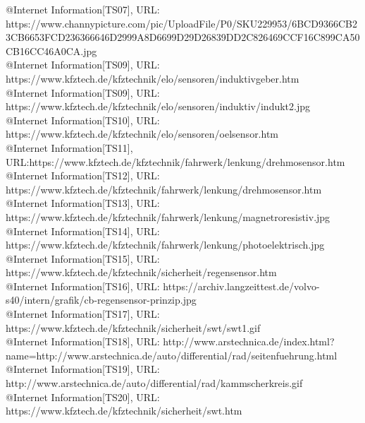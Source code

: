 @Internet{ Information[TS07],
	URL: https://www.channypicture.com/pic/UploadFile/P0/SKU229953/6BCD9366CB23CB6653FCD236366646D2999A8D6699D29D26839DD2C826469CCF16C899CA50CB16CC46A0CA.jpg}
\\

@Internet{ Information[TS09],
	URL:
https://www.kfztech.de/kfztechnik/elo/sensoren/induktivgeber.htm\
\\

@Internet{ Information[TS09],
	URL: https://www.kfztech.de/kfztechnik/elo/sensoren/induktiv/indukt2.jpg}
\\

@Internet{ Information[TS10],
	URL: https://www.kfztech.de/kfztechnik/elo/sensoren/oelsensor.htm}
\\

@Internet{ Information[TS11],
	URL:https://www.kfztech.de/kfztechnik/fahrwerk/lenkung/drehmosensor.htm}
\\

@Internet{ Information[TS12],
	URL: https://www.kfztech.de/kfztechnik/fahrwerk/lenkung/drehmosensor.htm}
\\

@Internet{ Information[TS13],
	URL: https://www.kfztech.de/kfztechnik/fahrwerk/lenkung/magnetroresistiv.jpg}
\\

@Internet{ Information[TS14],
	URL: https://www.kfztech.de/kfztechnik/fahrwerk/lenkung/photoelektrisch.jpg}
\\

@Internet{ Information[TS15],
	URL: https://www.kfztech.de/kfztechnik/sicherheit/regensensor.htm}
\\

@Internet{ Information[TS16],
	URL: https://archiv.langzeittest.de/volvo-s40/intern/grafik/cb-regensensor-prinzip.jpg}
\\

@Internet{ Information[TS17],
	URL: https://www.kfztech.de/kfztechnik/sicherheit/swt/swt1.gif}
\\

@Internet{ Information[TS18],
	URL: http://www.arstechnica.de/index.html?name=http://www.arstechnica.de/auto/differential/rad/seitenfuehrung.html}
\\

@Internet{ Information[TS19],
	URL: http://www.arstechnica.de/auto/differential/rad/kammscherkreis.gif}
\\

@Internet{ Information[TS20],
	URL: https://www.kfztech.de/kfztechnik/sicherheit/swt.htm}
\\

}
